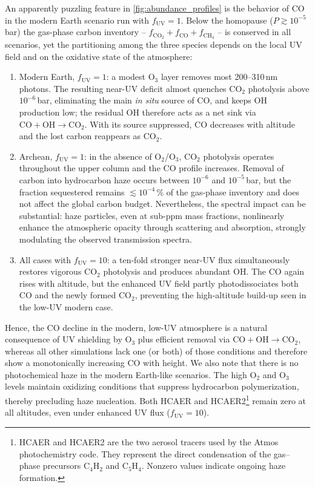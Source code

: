 An apparently puzzling feature in \autoref{fig:abundance_profiles} is the
behavior of CO in the modern Earth scenario run with
$f_{\mathrm{UV}}=1$.  Below the homopause ($P\!\gtrsim\!10^{-5}$\,bar) the
gas-phase carbon inventory -- $f_{\mathrm{CO_2}}+f_{\mathrm{CO}}+f_{\mathrm{CH_4}}$ -- is conserved in all
scenarios, yet the partitioning among the three species depends on the local UV field and on the oxidative state of the atmosphere:

\begin{enumerate}[label=\roman*]

\item Modern Earth, $f_{\mathrm{UV}}=1$: a modest O$_3$ layer removes most 200--310\,nm photons. The resulting near-UV deficit almost quenches CO$_2$ photolysis above $10^{-6}$\,bar, eliminating the main \emph{in situ} source of CO, and keeps OH production low; the residual OH therefore acts as a net sink via $\mathrm{CO+OH\rightarrow CO_2}$.  With its source suppressed, CO decreases with altitude and the lost carbon reappears as CO$_2$.

\item Archean, $f_{\mathrm{UV}}=1$: in the absence of O$_2$/O$_3$, CO$_2$ photolysis operates throughout the upper column and the CO profile increases.  Removal of carbon into hydrocarbon haze occurs between $10^{-6}$ and $10^{-5}$\,bar, but the fraction sequestered remains $\lesssim10^{-4}$\,\% of the gas-phase inventory and does not affect the global carbon budget. Nevertheless, the spectral impact can be substantial: haze particles, even at sub-ppm mass fractions, nonlinearly enhance the atmospheric opacity through scattering and absorption, strongly modulating the observed transmission spectra.

\item All cases with $f_{\mathrm{UV}}=10$: a ten-fold stronger near-UV flux simultaneously restores vigorous CO$_2$ photolysis and produces abundant OH. The CO again rises with altitude, but the enhanced UV field partly photodissociates both CO and the newly formed CO$_2$, preventing the high-altitude build-up seen in the low-UV modern case.

\end{enumerate}

Hence, the CO decline in the modern, low-UV atmosphere is a natural consequence of UV shielding by O$_3$ plus efficient removal via $\mathrm{CO} + \mathrm{OH} \rightarrow \mathrm{CO}_2$, whereas all other simulations lack one (or both) of those conditions and therefore show a monotonically increasing CO with height.
We also note that there is no photochemical haze in the modern Earth-like scenarios. The high O$_2$ and O$_3$ levels maintain oxidizing conditions that suppress hydrocarbon polymerization, thereby precluding haze nucleation. Both HCAER and HCAER2\footnote{HCAER and HCAER2 are the two aerosol tracers used by the Atmos photochemistry code. They represent the direct condensation of the gas–phase precursors C$_4$H$_2$ and C$_5$H$_4$. Nonzero values indicate ongoing haze formation.} remain zero at all altitudes, even under enhanced UV flux ($f_{\mathrm{UV}} = 10$).

